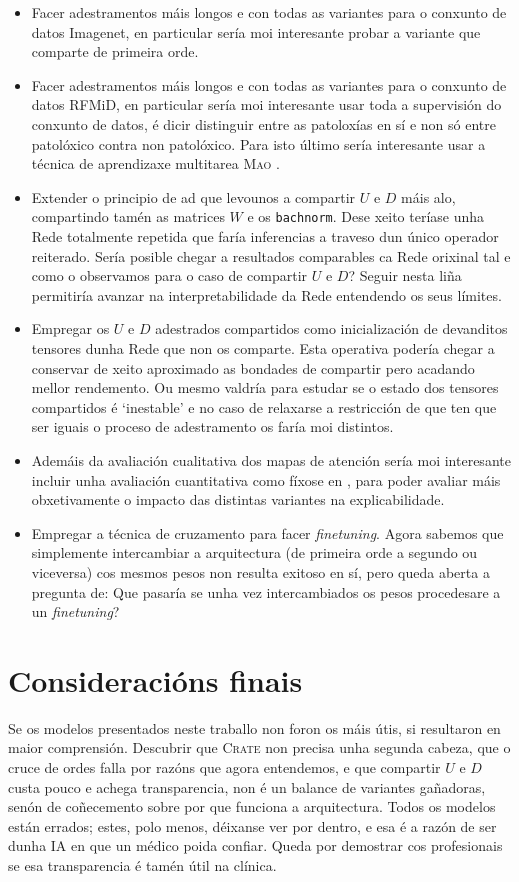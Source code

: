 \begin{itemize}
				\item Facer adestramentos máis longos e con todas as variantes para o conxunto de datos Imagenet, en particular sería moi interesante probar a variante que comparte de primeira orde.
				\item Facer adestramentos máis longos e con todas as variantes para o conxunto de datos RFMiD, en particular sería moi interesante usar toda a supervisión do conxunto de datos, é dicir distinguir entre as patoloxías en sí e non só entre patolóxico contra non patolóxico. Para isto último sería interesante usar a técnica de aprendizaxe multitarea \textsc{Mao} \cite{mao}.
				\item Extender o principio de \acrshort{ad} que levounos a compartir $U$ e $D$ máis alo, compartindo tamén as matrices $W$ e os \texttt{bachnorm}. Dese xeito teríase unha Rede totalmente repetida que faría inferencias a traveso dun único operador reiterado. Sería posible chegar a resultados comparables ca Rede orixinal tal e como o observamos para o caso de compartir $U$ e $D$? Seguir nesta liña permitiría avanzar na \gls{interpretabilidade} da Rede entendendo os seus límites.
				\item Empregar os $U$ e $D$ adestrados compartidos como inicialización de devanditos tensores dunha Rede que non os comparte. Esta operativa podería chegar a conservar de xeito aproximado as bondades de compartir pero acadando mellor rendemento. Ou mesmo valdría para estudar se o estado dos tensores compartidos é `inestable' e no caso de relaxarse a restricción de que ten que ser iguais o proceso de adestramento os faría moi distintos.
				\item Ademáis da avaliación cualitativa dos mapas de atención sería moi interesante incluir unha avaliación cuantitativa como fíxose en \cite{emergenciaSegmentacion}, para poder avaliar máis obxetivamente o impacto das distintas variantes na \gls{explicabilidade}.
				\item Empregar a técnica de cruzamento para facer \emph{finetuning}. Agora sabemos que simplemente intercambiar a arquitectura (de primeira orde a segundo ou viceversa) cos mesmos pesos non resulta exitoso en sí, pero queda aberta a pregunta de: Que pasaría se unha vez intercambiados os pesos procedesare a un \emph{finetuning}?
\end{itemize}

\section{Consideracións finais}

Se os modelos presentados neste traballo non foron os máis útis, si resultaron en maior comprensión. Descubrir que \textsc{Crate} non precisa unha segunda cabeza, que o cruce de ordes falla por razóns que agora entendemos, e que compartir $U$ e $D$ custa pouco e achega transparencia, non é un balance de variantes gañadoras, senón de coñecemento sobre por que funciona a arquitectura. Todos os modelos están errados; estes, polo menos, déixanse ver por dentro, e esa é a razón de ser dunha IA en que un médico poida confiar. Queda por demostrar cos profesionais se esa transparencia é tamén útil na clínica.
